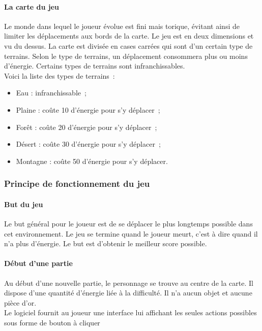 \documentclass[11pt]{article}
\begin{document}
\paragraph{La carte du jeu}

Le monde dans lequel le joueur évolue est fini mais torique, évitant ainsi de limiter les déplacements aux bords de la carte. Le jeu est en deux dimensions et vu du dessus. La carte est divisée en cases carrées qui sont d'un certain type de terrains. Selon le type de terrains, un déplacement consommera plus ou moins d'énergie. Certains types de terrains sont infranchissables.\\
Voici la liste des types de terrains~:

\begin{itemize}
   \item Eau : infranchissable~;
   \item Plaine : coûte 10 d'énergie pour s'y déplacer~;
   \item Forêt : coûte 20 d'énergie pour s'y déplacer~;
   \item Désert : coûte 30 d'énergie pour s'y déplacer~;
   \item Montagne : coûte 50 d'énergie pour s'y déplacer.
\end{itemize}



\subsubsection{Principe de fonctionnement du jeu}

\paragraph{But du jeu}

Le but général pour le joueur est de se déplacer le plus longtemps possible dans cet environnement. Le jeu se termine quand le joueur meurt, c'est à dire quand il n'a plus d'énergie. Le but est d'obtenir le meilleur score possible.

\paragraph{Début d'une partie}

Au début d'une nouvelle partie, le personnage se trouve au centre de la carte. Il dispose d'une quantité d'énergie liée à la difficulté. Il n'a aucun objet et aucune pièce d'or.\\
Le logiciel fournit au joueur une interface lui affichant les seules actions possibles sous forme de bouton à cliquer
\end{document}
